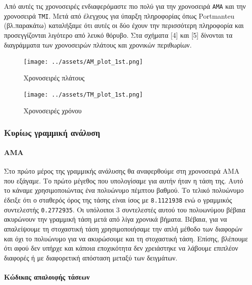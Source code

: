 \documentclass[11pt,]{article}
\let\oldparagraph\paragraph
\renewcommand{\paragraph}[1]{\oldparagraph{#1}\mbox{}}
\begin{document}
Από αυτές τις χρονοσειρές ενδιαφερόμαστε πιο πολύ για την χρονοσειρά
\texttt{AMA} και την χρονοσειρά \texttt{TMI}. Μετά από έλεγχους για
ύπαρξη πληροφορίας όπως Portmanteu (βλ.παρακάτω) καταλήξαμε ότι αυτές οι
δύο έχουν την περισσότερη πληροφορία και προσεγγίζονται λιγότερο από
λευκό θόρυβο. Στα σχήματα {[}4{]} και {[}5{]} δίνονται τα διαγράμματα
των χρονοσειρών πλάτους και χρονικών περιθωρίων.

\begin{figure}
\centering
\texttt{[image: ../assets/AM\_plot\_1st.png]}
\caption{Χρονοσειρές πλάτους}
\end{figure}

\begin{figure}
\centering
\texttt{[image: ../assets/TM\_plot\_1st.png]}
\caption{Χρονοσειρές χρόνου}
\end{figure}

\hypertarget{ux3baux3c5ux3c1ux3afux3c9ux3c2-ux3b3ux3c1ux3b1ux3bcux3bcux3b9ux3baux3ae-ux3b1ux3bdux3acux3bbux3c5ux3c3ux3b7}{%
\subsubsection{Κυρίως γραμμική
ανάλυση}\label{ux3baux3c5ux3c1ux3afux3c9ux3c2-ux3b3ux3c1ux3b1ux3bcux3bcux3b9ux3baux3ae-ux3b1ux3bdux3acux3bbux3c5ux3c3ux3b7}}

\hypertarget{ama}{%
\paragraph{AMA}\label{ama}}

Στο πρώτο μέρος της γραμμικής ανάλυσης θα αναφερθούμε στη χρονοσειρά AMA
που εξάγαμε. Το πρώτο μέγεθος που υπολογίσαμε για αυτήν ήταν η τάση της.
Αυτό το κάναμε χρησιμοποιώντας ένα πολυώνυμο πέμπτου βαθμού. Το τελικό
πολυώνυμο έδειξε ότι ο σταθερός όρος της τάσης είναι ίσος με
\texttt{8.1121938} ενώ ο γραμμικός συντελεστής \texttt{0.2772935}. Οι
υπόλοιποι 3 συντελεστές αυτού του πολυωνύμου βέβαια ακυρώνουν την
γραμμική τάση μετά από λίγα χρονικά βήματα. Βέβαια, για να απαλείψουμε
τη στοχαστική τάση χρησιμοποιήσαμε την απλή μέθοδο των διαφορών και όχι
το πολυώνυμο για να ακυρώσουμε και τη στοχαστική τάση. Επίσης, βλέπουμε
ότι αφού δεν υπήρχε και κάποια εποχικότητα δεν χρειάστηκε να λάβουμε
επιπλέον διαφορές ή με διαφορετική απόσταση μεταξύ των δειγμάτων.

\hypertarget{ux3baux3ceux3b4ux3b9ux3baux3b1ux3c2-ux3b1ux3c0ux3b1ux3bbux3bfux3b9ux3c6ux3aeux3c2-ux3c4ux3acux3c3ux3b5ux3c9ux3bd}{%
\paragraph{Κώδικας απαλοιφής
τάσεων}\label{ux3baux3ceux3b4ux3b9ux3baux3b1ux3c2-ux3b1ux3c0ux3b1ux3bbux3bfux3b9ux3c6ux3aeux3c2-ux3c4ux3acux3c3ux3b5ux3c9ux3bd}}
\end{document}
